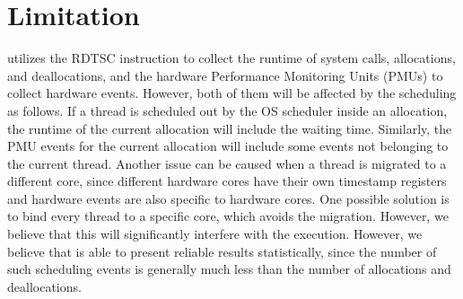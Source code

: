 \section{Limitation}

\label{sec:limitation}

\MP{} utilizes the RDTSC instruction to collect the runtime of system calls, allocations, and deallocations, and the hardware Performance Monitoring Units (PMUs) to collect hardware events. However, both of them will be affected by the scheduling as follows. If a thread is scheduled out by the OS scheduler inside an allocation, the runtime of the current allocation will include the waiting time. Similarly, the PMU events for the current allocation will  include some events not belonging to the current thread. Another issue can be caused when a thread is migrated to a different core, since different hardware cores have their own timestamp registers and hardware events are also specific to hardware cores.  One possible solution is to bind every thread to a specific core, which avoids the migration. However, we believe that this will significantly interfere with the execution. However, we believe that \MP{} is able to present reliable results statistically, since the number of such scheduling events is generally much less than the number of allocations and deallocations.   

